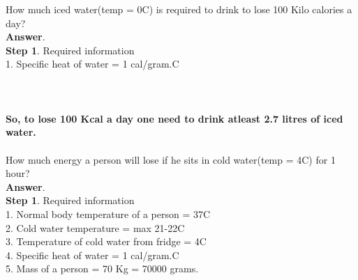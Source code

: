 \documentclass[11pt]{exam}
\begin{document}
\begin{questions}
\question
\label{Q15:Cold water to loose 100Kcal/day}
How much iced water(temp = 0\textdegree{}C) is required to drink to lose 100 Kilo calories a day? \\
\textbf{Answer}. \\
\textbf{Step 1}. Required information \\
                1. Specific heat of water = 1 cal/gram.\textdegree{}C \\
\\
 \\ \\
                 \textbf{So, to lose 100 Kcal a day one need to drink atleast 2.7 litres of iced water.} \\ \\ 


\question
\label{Q16:Cold water weight loss}
How much energy a person will lose if he sits in cold water(temp = 4\textdegree{}C) for 1 hour? \\
\textbf{Answer}. \\
\textbf{Step 1}. Required information \\
                1. Normal body temperature of a person = 37\textdegree{}C\\
                2. Cold water temperature = max 21-22\textdegree{}C \\
                3. Temperature of cold water from fridge = 4\textdegree{}C \\
                4. Specific heat of water = 1 cal/gram.\textdegree{}C \\
                5. Mass of a person = 70 Kg = 70000 grams.\\
                

\end{questions}
\end{document}
